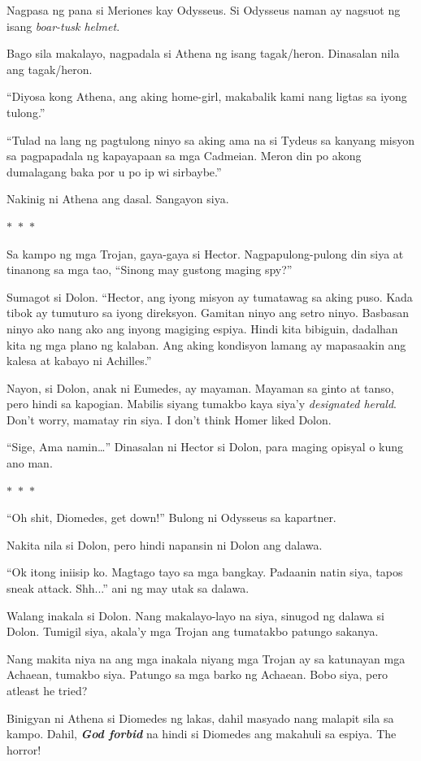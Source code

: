 \documentclass[12pt,letterpaper]{report}
\newcommand{\seperate}{\begin{center}$\ast$~$\ast$~$\ast$\end{center}}
\begin{document}
Nagpasa ng pana si Meriones kay Odysseus. Si Odysseus naman ay nagsuot ng isang \textit{boar-tusk helmet}.

Bago sila makalayo, nagpadala si Athena ng isang tagak/heron. Dinasalan nila ang tagak/heron.

``Diyosa kong Athena, ang aking home-girl, makabalik kami nang ligtas sa iyong tulong.''

``Tulad na lang ng pagtulong ninyo sa aking ama na si Tydeus sa kanyang misyon sa pagpapadala ng kapayapaan sa mga Cadmeian. Meron din po akong dumalagang baka por u po ip wi sirbaybe.''

Nakinig ni Athena ang dasal. Sangayon siya.

\seperate

Sa kampo ng mga Trojan, gaya-gaya si Hector. Nagpapulong-pulong din siya at tinanong sa mga tao, ``Sinong may gustong maging spy?''

Sumagot si Dolon. ``Hector, ang iyong misyon ay tumatawag sa aking puso. Kada tibok ay tumuturo sa iyong direksyon. Gamitan ninyo ang setro ninyo. Basbasan ninyo ako nang ako ang inyong magiging espiya. Hindi kita bibiguin, dadalhan kita ng mga plano ng kalaban. Ang aking kondisyon lamang ay mapasaakin ang kalesa at kabayo ni Achilles.''

Nayon, si Dolon, anak ni Eumedes, ay mayaman. Mayaman sa ginto at tanso, pero hindi sa kapogian. Mabilis siyang tumakbo kaya siya'y \textit{designated herald}. Don't worry, mamatay rin siya. I don't think Homer liked Dolon.

``Sige, Ama namin\dots'' Dinasalan ni Hector si Dolon, para maging opisyal o kung ano man.

\seperate

``Oh shit, Diomedes, get down!'' Bulong ni Odysseus sa kapartner.

Nakita nila si Dolon, pero hindi napansin ni Dolon ang dalawa.

``Ok itong iniisip ko. Magtago tayo sa mga bangkay. Padaanin natin siya, tapos sneak attack. Shh...'' ani ng may utak sa dalawa.

Walang inakala si Dolon. Nang makalayo-layo na siya, sinugod ng dalawa si Dolon. Tumigil siya, akala'y mga Trojan ang tumatakbo patungo sakanya.

Nang makita niya na ang mga inakala niyang mga Trojan ay sa katunayan mga Achaean, tumakbo siya. Patungo sa mga barko ng Achaean. Bobo siya, pero atleast he tried?

Binigyan ni Athena si Diomedes ng lakas, dahil masyado nang malapit sila sa kampo. Dahil, \textbf{\textit{God forbid}} na hindi si Diomedes ang makahuli sa espiya. The horror!
\end{document}
